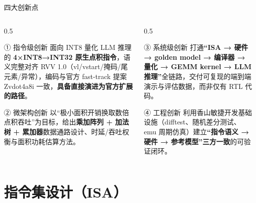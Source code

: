 \documentclass[aspectratio=169]{beamer}
\begin{document}
\begin{frame}{四大创新点}
\begin{columns}[T]
\begin{column}{0.5\textwidth}
\begin{block}{① 指令级创新}
面向 INT8 量化 LLM 推理的 \textbf{4×INT8→INT32 原生点积指令}，语义完整对齐 RVV 1.0（vl/vstart/掩码/尾元素/异常），编码与官方 fast-track 提案 Zvdot4a8i 一致，\textbf{具备直接演进为官方扩展的路径}。
\end{block}
\begin{block}{② 微架构创新}
以“极小面积开销换取数倍点积吞吐”为目标，给出\textbf{乘加阵列 + 加法树 + 累加器}数据通路设计、时延/吞吐权衡与面积功耗估算方法。
\end{block}
\end{column}
\begin{column}{0.5\textwidth}
\begin{block}{③ 系统级创新}
打通\textbf{“ISA → 硬件 → golden model → 编译器 → 量化 → GEMM kernel → LLM 推理”}全链路，交付可复现的端到端演示与评估数据，而非仅有 RTL 代码。
\end{block}
\begin{block}{④ 工程创新}
利用香山敏捷开发基础设施（difftest、随机差分测试、emu 周期仿真）建立\textbf{“指令语义 → 硬件 → 参考模型”三方一致}的可验证闭环。
\end{block}
\end{column}
\end{columns}
\end{frame}

\section{指令集设计（ISA）}
\end{document}
